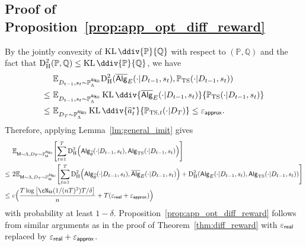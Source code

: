 \documentclass[10pt]{article}
\renewcommand{\epsilon}{\varepsilon}
\newcommand{\eps}{\varepsilon}
\newcommand{\KL}{\operatorname{KL}\ddiv}
\newcommand{\<}{\left\langle}
\renewcommand{\>}{\right\rangle}
\newcommand{\paren}[1]{{\left( #1 \right)}}
\newcommand{\brac}[1]{{\left[ #1 \right]}}
\newcommand{\E}{\mathbb{E}}
\renewcommand{\P}{\mathbb{P}}
\newcommand{\Q}{\mathbb{Q}}
\newcommand{\inst}{{\mathsf{M}}}
\newcommand{\HelDs}{{\mathrm{D}^2_{\mathrm{H}}}}
\newcommand{\TS}{{\mathrm{TS}}}
\newcommand{\state}{{s}}
\newcommand{\action}{{a}}
\newcommand{\totlen}{{T}}
\newcommand{\sAlg}{{\mathsf{Alg}}}
\newcommand{\osAlg}{\overline{\mathsf{Alg}}}
\newcommand{\dset}{{D}}
\newcommand{\Numobs}{{n}}
\newcommand{\Parspace}{{\Theta}}
\newcommand{\appeps}{\eps_{{\mathsf{approx}}}}
\newcommand{\EstPar}{{\widehat{\theta}}}
\newcommand{\prior}{{\Lambda}}
\newcommand{\shortexp}{{E}}
\newcommand{\geneps}{{\epsilon}_{\sf real}}
\begin{document}
\subsection{Proof of Proposition~\ref{prop:app_opt_diff_reward}}\label{app:proof-prop-diff-reward-app-opt}
By the jointly convexity of $\KL{\P}{\Q}$ with respect to $(\P,\Q)$ and the fact that $\HelDs(\P,\Q)\leq\KL{\P}{\Q}$, we have
\begin{align*}
  &~\E_{\dset_{t-1},\state_t\sim\P_\prior^{\sAlg_0}}\HelDs(\osAlg_{\shortexp}(\cdot|\dset_{t-1},\state_t),\P_{\TS}(\cdot|\dset_{t-1},\state_t))\\
  \leq &~
  \E_{\dset_{t-1},\state_t\sim\P_\prior^{\sAlg_0}}\KL{\osAlg_{\shortexp}(\cdot|\dset_{t-1},\state_t)}{\P_{\TS}(\cdot|\dset_{t-1},\state_t)}\\
   \leq &~
 \E_{\dset_\totlen\sim\P_{\prior}^{\sAlg_0}}\KL{\widehat\action^*_t}{\P_{\TS,t}(\cdot|\dset_\totlen)}\leq\appeps.
\end{align*} Therefore, applying Lemma~\ref{lm:general_imit} gives
 \begin{align*}
        &~\E_{\inst\sim \prior, \dset_\totlen\sim \P^{\sAlg_0}_\inst}\brac{ \sum_{t=1}^\totlen \HelDs\paren{ \sAlg_{{\EstPar}}(\cdot|\dset_{t-1},\state_t ), \sAlg_{\TS}(\cdot|\dset_{t-1},\state_t )} }\\
        \le&~
        2\E_{\inst\sim \prior, \dset_\totlen\sim \P^{\sAlg_0}_\inst}\brac{ \sum_{t=1}^\totlen \HelDs\paren{ \sAlg_{{\EstPar}}(\cdot|\dset_{t-1},\state_t ), \osAlg_{\shortexp}(\cdot|\dset_{t-1},\state_t )}+\HelDs\paren{ \sAlg_{{\shortexp}}(\cdot|\dset_{t-1},\state_t ), \sAlg_{\TS}(\cdot|\dset_{t-1},\state_t )} }\\
       \le&~
       c\Big(\frac{\totlen \log \brac{ \cN_{\Parspace}(1/(\Numobs\totlen)^2) \totlen/\delta } }{n} + \totlen(\geneps+\appeps)\Big)
    \end{align*}
    with probability at least $1-\delta$. Proposition~\ref{prop:app_opt_diff_reward} follows from similar arguments as in the proof of Theorem~\ref{thm:diff_reward} with $\geneps$ replaced by $\geneps+\appeps$.
\end{document}
